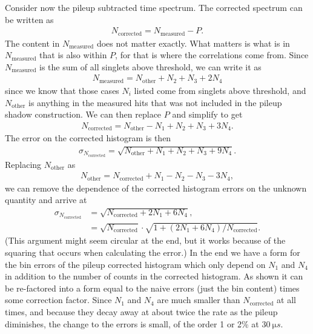Consider now the pileup subtracted time spectrum. The corrected spectrum can be written as
 	\begin{align}
 		N_{\text{corrected}} = N_{\text{measured}} - P.
	\end{align}
The content in $N_{\text{measured}}$ does not matter exactly. What matters is what is in $N_{\text{measured}}$ that is also within $P$, for that is where the correlations come from. Since $N_{\text{measured}}$ is the sum of all singlets above threshold, we can write it as
 	\begin{align}
 		N_{\text{measured}} = N_{\text{other}} + N_{2} + N_{3} + 2 N_{4}
	\end{align}
since we know that those cases $N_{i}$ listed come from singlets above threshold, and $N_{\text{other}}$ is anything in the measured hits that was not included in the pileup shadow construction. We can then replace $P$ and simplify to get
 	\begin{align}
 		N_{\text{corrected}} = N_{\text{other}} - N_{1} + N_{2} + N_{3} + 3 N_{4}.
	\end{align}
The error on the corrected histogram is then 
 	\begin{align}
 		\sigma_{N_{\text{corrected}}} = \sqrt{N_{\text{other}} + N_{1} + N_{2} + N_{3} + 9 N_{4}}.
	\end{align}
Replacing $N_{\text{other}}$ as
 	\begin{align}
 		N_{\text{other}} = N_{\text{corrected}} + N_{1} - N_{2} - N_{3} - 3 N_{4},
	\end{align}
we can remove the dependence of the corrected histogram errors on the unknown quantity and arrive at
	\begin{equation}	
	\begin{aligned}
 		\sigma_{N_{\text{corrected}}} &= \sqrt{N_{\text{corrected}} + 2 N_{1} + 6 N_{4}}, \\
 									  &= \sqrt{N_{\text{corrected}}} \cdot \sqrt{1 + (2 N_{1} + 6 N_{4})/N_{\text{corrected}}}.
 	\label{eq:pileupModErrors}
	\end{aligned}
	\end{equation}
(This argument might seem circular at the end, but it works because of the squaring that occurs when calculating the error.) In the end we have a form for the bin errors of the pileup corrected histogram which only depend on $N_{1}$ and $N_{4}$ in addition to the number of counts in the corrected histogram. As shown it can be re-factored into a form equal to the naive errors (just the bin content) times some correction factor. Since $N_{1}$ and $N_{4}$ are much smaller than $N_{\text{corrected}}$ at all times, and because they decay away at about twice the rate as the pileup diminishes, the change to the errors is small, of the order 1 or 2\% at $\SI{30}{\micro s}$.




